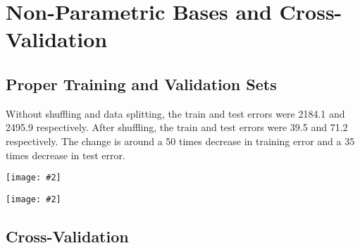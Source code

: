 \documentclass{article}
\newcommand{\centerfig}[2]{\begin{center}\texttt{[image: \#2]}\end{center}}
\begin{document}
\section{Non-Parametric Bases and Cross-Validation}

\subsection{Proper Training and Validation Sets}

Without shuffling and data splitting, the train and test errors were 2184.1 and 2495.9 respectively. After shuffling, the train and test errors were 39.5 and 71.2 respectively. The change is around a 50 times decrease in training error and a 35 times decrease in test error. 

\centerfig{.7}{../figs/least_squares_rbf_bad.pdf}  
\centerfig{.7}{../figs/least_squares_rbf_good.pdf}  

\subsection{Cross-Validation}
\end{document}
